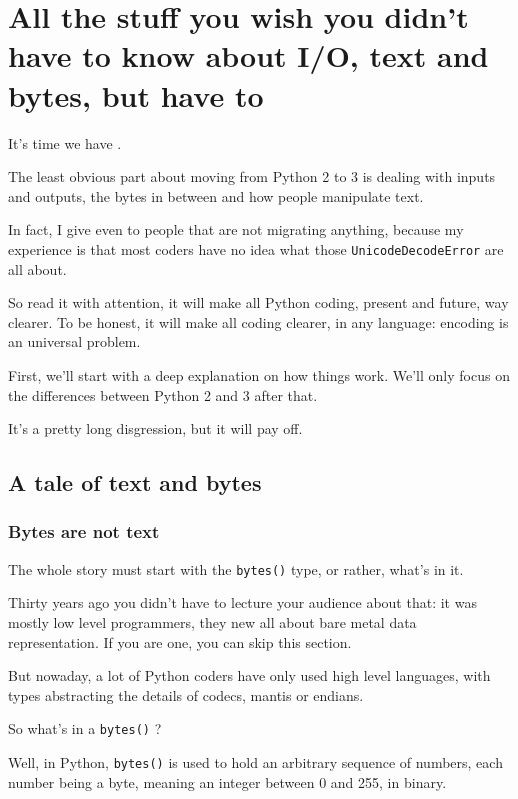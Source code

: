 \chapter{All the stuff you wish you didn't have to know about I/O, text and bytes, but have to}\label{chap:text_and_bytes}

It's time we have .

The least obvious part about moving from Python 2 to 3 is dealing with inputs and outputs, the bytes in between and how people manipulate text.

In fact, I give  even to people that are not migrating anything, because my experience is that most coders have no idea what those \lstinline{UnicodeDecodeError} are all about.

So read it with attention, it will make all Python coding, present and future, way clearer. To be honest, it will make all coding clearer, in any language: encoding is an universal problem.

First, we'll start with a deep explanation on how things work. We'll only focus on the differences between Python 2 and 3 after that.

It's a pretty long disgression, but it will pay off.

\section{A tale of text and bytes}

\subsection{Bytes are not text}

The whole story must start with the \lstinline{bytes()} type, or rather, what's in it.

Thirty years ago you didn't have to lecture your audience about that: it was mostly low level programmers, they new all about bare metal data representation. If you are one, you can skip this section.

But nowaday, a lot of Python coders have only used high level languages, with types abstracting the details of codecs, mantis or endians.

So what's in a \lstinline{bytes()} ?

Well, in Python, \lstinline{bytes()} is used to hold an arbitrary sequence of numbers, each number being a byte, meaning an integer between 0 and 255, in binary.

